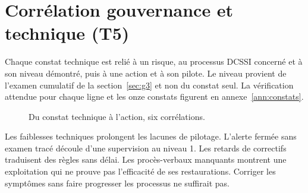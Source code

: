 \section{Corrélation gouvernance et technique (T5)}

Chaque constat technique est relié à un risque, au processus DCSSI concerné et à son niveau démontré, puis à une action et à son pilote. Le niveau provient de l'examen cumulatif de la section~\ref{sec:g3} et non du constat seul. La vérification attendue pour chaque ligne et les onze constats figurent en annexe~\ref{ann:constats}.

\begin{figure}[H]
\centering
\resizebox{\linewidth}{!}{}
\caption{Du constat technique à l'action, six corrélations.}
\end{figure}

Les faiblesses techniques prolongent les lacunes de pilotage. L'alerte fermée sans examen tracé découle d'une supervision au niveau 1. Les retards de correctifs traduisent des règles sans délai. Les procès-verbaux manquants montrent une exploitation qui ne prouve pas l'efficacité de ses restaurations. Corriger les symptômes sans faire progresser les processus ne suffirait pas.
